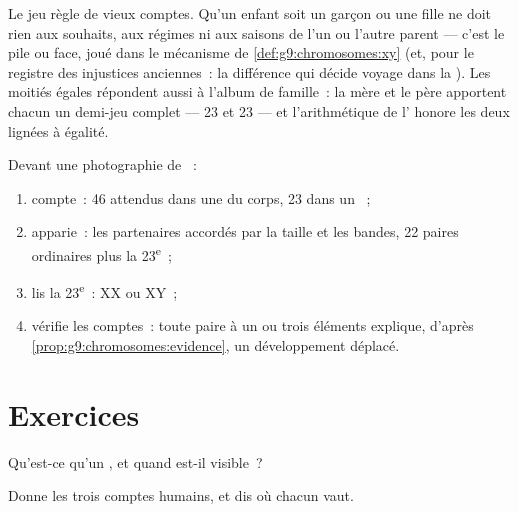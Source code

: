 \begin{example}\label{ex:g9:chromosomes:answers}
Le jeu règle de vieux comptes. Qu'un enfant soit un garçon
ou une fille ne doit rien aux souhaits, aux régimes ni aux
saisons de l'un ou l'autre parent --- c'est le pile ou
face, joué dans le mécanisme de
\cref{def:g9:chromosomes:xy} (et, pour le registre des
injustices anciennes~: la différence qui décide voyage dans
la \emph{}). Les moitiés égales répondent aussi
à l'album de famille~: la mère et le père apportent chacun
un demi-jeu complet --- 23 et 23 --- et l'arithmétique de
l' honore les deux lignées à égalité.
\end{example}

\begin{method}\label{met:g9:chromosomes:read}
Devant une photographie de ~:
\begin{enumerate}
  \item compte~: 46 attendus dans une  du corps, 23
        dans un ~;
  \item apparie~: les partenaires accordés par la taille et
        les bandes, 22 paires ordinaires plus la 23\textsuperscript{e}~;
  \item lis la 23\textsuperscript{e}~: XX ou XY~;
  \item vérifie les comptes~: toute paire à un ou trois
        éléments explique, d'après
        \cref{prop:g9:chromosomes:evidence}, un
        développement déplacé.
\end{enumerate}
\end{method}

\section{Exercices}

\begin{exercise}[$\star$]\label{exo:g9:chromosomes:1}
Qu'est-ce qu'un , et quand est-il visible~?
\end{exercise}

\begin{exercise}[$\star$]\label{exo:g9:chromosomes:2}
Donne les trois comptes humains, et dis où chacun vaut.
\end{exercise}

